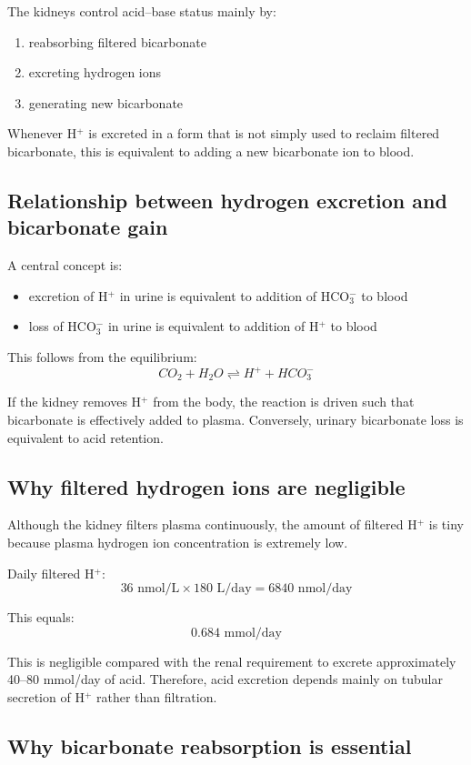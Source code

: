\documentclass[11pt,a4paper]{article}
\begin{document}
The kidneys control acid--base status mainly by:
\begin{enumerate}
    \item reabsorbing filtered bicarbonate
    \item excreting hydrogen ions
    \item generating new bicarbonate
\end{enumerate}

Whenever H$^+$ is excreted in a form that is not simply used to reclaim filtered bicarbonate, this is equivalent to adding a new bicarbonate ion to blood.

\subsection{Relationship between hydrogen excretion and bicarbonate gain}

A central concept is:
\begin{itemize}
    \item excretion of H$^+$ in urine is equivalent to addition of HCO$_3^-$ to blood
    \item loss of HCO$_3^-$ in urine is equivalent to addition of H$^+$ to blood
\end{itemize}

This follows from the equilibrium:
\[
CO_2 + H_2O \rightleftharpoons H^+ + HCO_3^-
\]

If the kidney removes H$^+$ from the body, the reaction is driven such that bicarbonate is effectively added to plasma. Conversely, urinary bicarbonate loss is equivalent to acid retention.

\subsection{Why filtered hydrogen ions are negligible}

Although the kidney filters plasma continuously, the amount of filtered H$^+$ is tiny because plasma hydrogen ion concentration is extremely low.

Daily filtered H$^+$:
\[
36 \text{ nmol/L} \times 180 \text{ L/day} = 6840 \text{ nmol/day}
\]

This equals:
\[
0.684 \text{ mmol/day}
\]

This is negligible compared with the renal requirement to excrete approximately 40--80 mmol/day of acid. Therefore, acid excretion depends mainly on tubular secretion of H$^+$ rather than filtration.

\subsection{Why bicarbonate reabsorption is essential}
\end{document}
